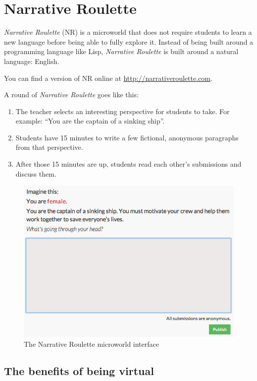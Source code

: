\section{Narrative Roulette}

\emph{Narrative Roulette} (NR) is a microworld that does not require
students to learn a new language before being able to fully explore it.
Instead of being built around a programming language like Lisp,
\emph{Narrative Roulette} is built around a natural language: English.

You can find a version of NR online at \url{http://narrativeroulette.com}.

A round of \emph{Narrative Roulette} goes like this: 

\begin{enumerate}
\item The teacher selects an interesting perspective for students to take. For example:
``You are the captain of a sinking ship''. 
\item Students have 15 minutes to write a few fictional, anonymous paragraphs from that perspective. 
\item After those 15 minutes are up, students read each other's
submissions and discuss them.
\end{enumerate}

\begin{figure}[ht!]
\centering
\includegraphics[width=115mm]{img/narrative_editor.png}
\caption{The Narrative Roulette microworld interface}
\label{overflow}
\end{figure}

\subsection{The benefits of being virtual}

